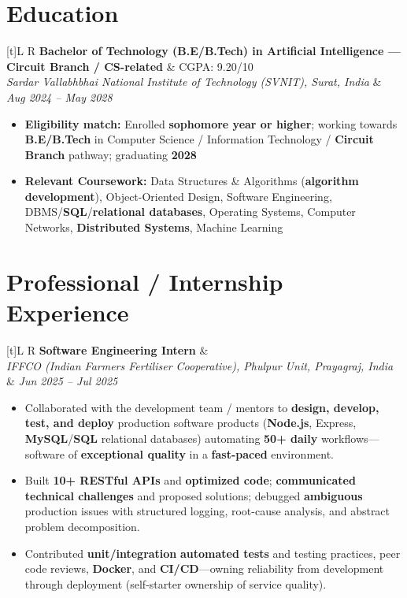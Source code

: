 \documentclass[a4paper,10pt]{article}
\newcommand{\resumeSubheading}[4]{%
  \vspace{0.4mm}
  \noindent
  \begin{tabularx}{\textwidth}[t]{L R}
    \textbf{#1} & #4 \\
    \textit{#3} & \textit{#2} \\
  \end{tabularx}
  \vspace{-0.4mm}%
}
\begin{document}
\section{Education}
\small
\resumeSubheading
  {Bachelor of Technology (B.E/B.Tech) in Artificial Intelligence --- Circuit Branch / CS-related}{Aug 2024 -- May 2028}
  {Sardar Vallabhbhai National Institute of Technology (SVNIT), Surat, India}{CGPA: 9.20/10}
\begin{itemize}
  \item \textbf{Eligibility match:} Enrolled \textbf{sophomore year or higher}; working towards \textbf{B.E/B.Tech} in Computer Science / Information Technology / \textbf{Circuit Branch} pathway; graduating \textbf{2028}
  \item \textbf{Relevant Coursework:} Data Structures \& Algorithms (\textbf{algorithm development}), Object-Oriented Design, Software Engineering, DBMS/\textbf{SQL}/\textbf{relational databases}, Operating Systems, Computer Networks, \textbf{Distributed Systems}, Machine Learning
\end{itemize}

\section{Professional / Internship Experience}
\small
\resumeSubheading
  {Software Engineering Intern}{Jun 2025 -- Jul 2025}
  {IFFCO (Indian Farmers Fertiliser Cooperative), Phulpur Unit, Prayagraj, India}{}
\begin{itemize}
  \item Collaborated with the development team / mentors to \textbf{design, develop, test, and deploy} production software products (\textbf{Node.js}, Express, \textbf{MySQL}/\textbf{SQL} relational databases) automating \textbf{50+ daily} workflows---software of \textbf{exceptional quality} in a \textbf{fast-paced} environment.
  \item Built \textbf{10+ RESTful APIs} and \textbf{optimized code}; \textbf{communicated technical challenges} and proposed solutions; debugged \textbf{ambiguous} production issues with structured logging, root-cause analysis, and abstract problem decomposition.
  \item Contributed \textbf{unit/integration} \textbf{automated tests} and testing practices, peer code reviews, \textbf{Docker}, and \textbf{CI/CD}---owning reliability from development through deployment (self-starter ownership of service quality).
\end{itemize}
\end{document}

